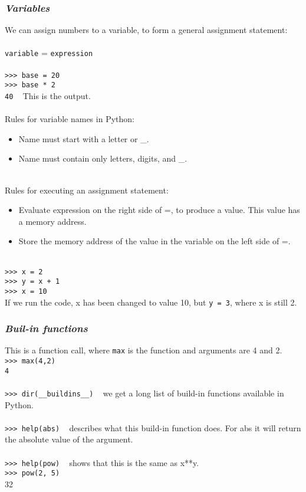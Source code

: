 \documentclass{article}
\begin{document}
{{{\subsubsection{\small\textsl{Variables}}
We can assign numbers to a variable, to form a general assignment statement:\\
\\
\texttt{variable} = \texttt{expression}\\
\\
\texttt{>>> base = 20} \\
\texttt{>>> base * 2}\\
\texttt{40} ~ This is the output.\\
\\
Rules for variable names in Python:
\begin{itemize}
\item Name must start with a letter or \_.
\item Name must contain only letters, digits, and \_.
\end{itemize}
\\
Rules for executing an assignment statement:
\begin{itemize}
\item Evaluate expression on the right side of =, to produce a value. This value has a memory address.
\item Store the memory address of the value in the variable on the left side of =.
\end{itemize}
\\
\texttt{>>> x = 2}\\
\texttt{>>> y = x + 1}\\
\texttt{>>> x = 10}\\
If we run the code, x has been changed to value 10, but \texttt{y = 3}, where x is still 2. 

\subsubsection{\small\textsl{Buil-in functions}}
This is a function call, where \texttt{max} is the function and arguments are 4 and 2.\\
\texttt{>>> max(4,2)}\\
\texttt{4}\\
\\
\texttt{>>> dir(\_\_buildins\_\_)} ~ we get a long list of build-in functions available in Python.\\
\\
\texttt{>>> help(abs)} ~ describes what this build-in function does. For abs it will return the absolute value of the argument.\\
\\
\texttt{>>> help(pow)} ~ shows that this is the same as x**y.\\
\texttt{>>> pow(2, 5)}\\
32

}}}
\end{document}
